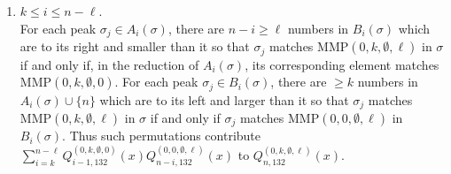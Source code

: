 \documentclass[
final,nomarks
]{dmtcs-episciences}
\newcommand{\Qmmn}[2]{Q_{#2,132}^{(#1)}(x)}
\newcommand{\MMP}{\mathrm{MMP}}
\begin{document}
\begin{enumerate}[{\bf Case }\bf 1.]
	\item \begin{math}k\leq i \leq n-\ell\end{math}.\\
	For each peak \begin{math}\sigma_j \in A_i(\sigma)\end{math},   
	there are \begin{math}n-i\geq \ell\end{math} numbers in \begin{math}B_i(\sigma)\end{math} which are to its right and smaller than it 
	so that \begin{math}\sigma_j\end{math} matches \begin{math}\MMP(0,k,\emptyset,\ell)\end{math} in \begin{math}\sigma\end{math} if and only if, 
	in the reduction of \begin{math}A_i(\sigma)\end{math}, its corresponding element matches 
	\begin{math}\MMP(0,k,\emptyset,0)\end{math}. For each peak \begin{math}\sigma_j \in B_i(\sigma)\end{math},   
	there are \begin{math}\geq k\end{math} numbers in \begin{math}A_i(\sigma) \cup \{n\}\end{math} which are to its left  and larger  than it 
	so that \begin{math}\sigma_j\end{math} matches \begin{math}\MMP(0,k,\emptyset,\ell)\end{math} in \begin{math}\sigma\end{math} if and only if 
	\begin{math}\sigma_j\end{math} matches \begin{math}\MMP(0,0,\emptyset,\ell)\end{math} in \begin{math}B_i(\sigma)\end{math}.  
	Thus such 
	permutations contribute \begin{math}\sum_{i=k}^{n-\ell}\Qmmn{0,k,\emptyset,0}{i-1}\Qmmn{0,0,\emptyset,\ell}{n-i}\end{math} to 
	\begin{math}\Qmmn{0,k,\emptyset,\ell}{n}\end{math}.
	

\end{enumerate}
\end{document}
